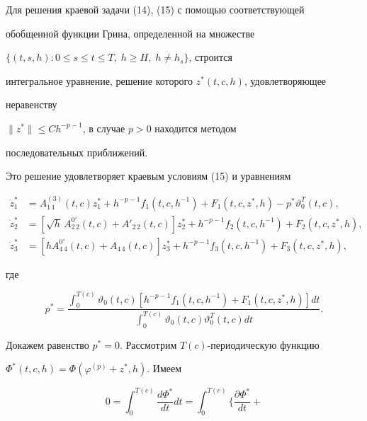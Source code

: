 \begin{pf}
 


Для решения краевой задачи (14), (15) с помощью соответствующей 


обобщенной функции Грина, определенной на множестве 


$\{(t,s,h):0\le s\le t\le T,\;h\ge H,\;h\ne h_s\}$, строится 


интегральное уравнение, решение которого $z^*(t,c,h)$, удовлетворяющее 


неравенству 


$\|z^*\|\le C h^{-p-1}$, в случае $p>0$ находится методом 


последовательных приближений. 


Это решение удовлетворяет краевым условиям (15) и уравнениям 


\begin{align*} 


\Dot z^*_1 &=A^{(3)}_{1\,1}(t,c)z^*_1+h^{-p-1} 


f_1(t,c,h^{-1})+F_1(t,c,z^*,h)- 


p^*\vartheta^T_0(t,c), \\ 


% 


\Dot z^*_2 &=[\sqrt{h}\,A^{0'}_{2\,2}(t,c)+A'_{2\,2}(t,c)] 


z^*_2+h^{-p-1}f_2(t,c,h^{-1})+F_2(t,c,z^*,h), \\ 


\Dot z^*_3 &=[h A^{0'}_{4\,4}(t,c)+A_{4\,4}(t,c)]z^*_3+ 


h^{-p-1}f_3(t,c,h^{-1})+F_3(t,c,z^*,h), 


\end{align*} 


где 


$$ 


p^*=\frac{\displaystyle \int^{T(c)}_0\vartheta_0(t,c) 


[h^{-p-1}f_1(t,c,h^{-1})+F_1(t,c,z^*,h)]dt} 


{\displaystyle \int^{T(c)}_0\vartheta_0(t,c) 


\vartheta^T_0(t,c)dt}. 


$$ 


Докажем равенство $p^*=0$. Рассмотрим $T(c)$-периодическую функцию 


$\Phi^*(t,c,h)=\Phi(\varphi^{(p)}+z^*,h)$. Имеем 


\begin{equation} 


0=\int^{T(c)}_0\frac{d\Phi^*}{dt}dt= 


\int^{T(c)}_0\biggl\{\frac{\partial\Phi^*}{dt}+ 



\end{equation}
\end{pf}
